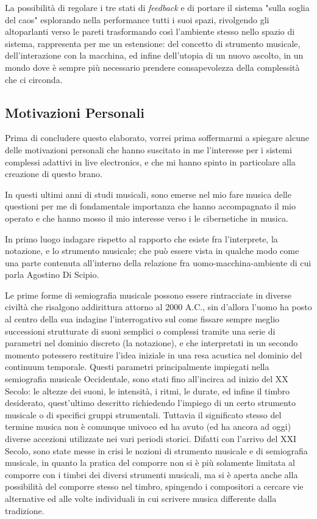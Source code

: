 \vspace{0.5cm}

La possibilità di regolare i tre stati di \emph{feedback} e di portare il sistema "sulla soglia del caos"
esplorando nella performance tutti i suoi spazi, 
rivolgendo gli altoparlanti verso le pareti trasformando così l'ambiente stesso
nello spazio di sistema, rappresenta per me un estensione: del concetto di strumento musicale, 
dell'interazione con la macchina, ed infine dell'utopia di un nuovo ascolto,
in un mondo dove è sempre più necessario prendere consapevolezza della complessità che ci circonda.

\subsection{Motivazioni Personali}
\label{Motivazioni Personali}

Prima di concludere questo elaborato, 
vorrei prima soffermarmi a spiegare alcune delle motivazioni 
personali che hanno suscitato in me l'interesse per i 
sistemi complessi adattivi in live electronics, 
e che mi hanno spinto in particolare alla creazione di questo brano. 

In questi ultimi anni di studi musicali, sono emerse nel mio fare musica 
delle questioni per me di fondamentale importanza che hanno accompagnato il mio operato
e che hanno mosso il mio interesse verso i le cibernetiche in musica. 

In primo luogo indagare rispetto al rapporto che esiste fra l'interprete, la notazione, e lo strumento musicale;
che può essere vista in qualche modo come una parte contenuta all'interno 
della relazione fra uomo-macchina-ambiente di cui parla
Agostino Di Scipio. 

Le prime forme di semiografia musicale possono essere rintracciate in diverse civiltà 
che risalgono addirittura attorno al 2000 A.C.,
sin d'allora l'uomo ha posto al centro della sua indagine l'interrogativo sul come fissare sempre meglio 
successioni strutturate di suoni semplici o complessi tramite una serie di parametri nel dominio discreto (la notazione), 
e che interpretati in un secondo momento potessero restituire l'idea iniziale in una resa 
acustica nel dominio del continuum temporale.
Questi parametri principalmente impiegati nella semiografia musicale Occidentale, 
sono stati fino all'incirca ad inizio del XX Secolo: 
le altezze dei suoni, le intensità, i ritmi, le durate, ed infine il timbro desiderato, 
quest'ultimo descritto richiedendo l'impiego di un certo strumento musicale o di specifici gruppi strumentali.
Tuttavia il significato stesso del termine musica non è comunque univoco ed ha avuto (ed ha ancora ad oggi) 
diverse accezioni utilizzate nei vari periodi storici.
Difatti con l'arrivo del XXI Secolo, sono state messe in crisi le nozioni di strumento musicale e di semiografia musicale, 
in quanto la pratica del comporre non si è più solamente limitata al comporre 
con i timbri dei diversi strumenti musicali, ma si è aperta anche alla possibilità del comporre stesso nel timbro, 
spingendo i compositori a cercare vie alternative ed alle volte individuali in cui scrivere musica differente dalla tradizione.


